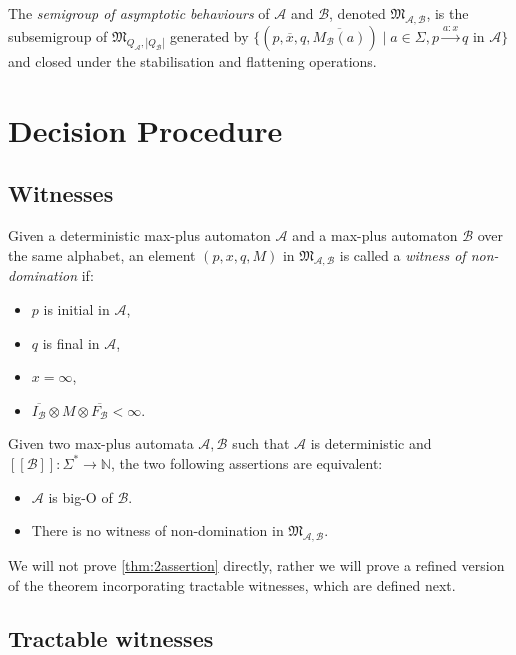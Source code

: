 \documentclass{lmcs}
\theoremstyle{remark}
\newcommand{\N}{\mathbb{N}}
\newcommand{\ideal}{\mathfrak{M}}
\newcommand{\autA}{\mathcal{A}}
\newcommand{\autB}{\mathcal{B}}
\newcommand{\brfunc}[1]{[\![#1]\!]}
\newcommand{\funcB}{\brfunc{\autB}}
\theoremstyle{remark}
\begin{document}
\begin{defi}\label{def:sgab}
The \emph{semigroup of asymptotic behaviours} of $\autA$ and $\autB$, denoted $\ideal_{\autA,\autB}$, is the subsemigroup of $\ideal_{Q_\autA,|Q_\autB|}$ generated by $\{(p,\overline{x},q,\overline{M_\autB(a)}) \mid a\in \Sigma, p\xrightarrow{a:x}q \text{ in } \autA\}$ and closed under the stabilisation and flattening operations.
\end{defi}


\section{Decision Procedure}
\label{sec:decision}

\subsection{Witnesses}

Given a deterministic max-plus automaton $\autA$ and a max-plus automaton $\autB$ over the same alphabet, an element $(p,x,q,M)$ in $\ideal_{\autA,\autB}$ is called a \emph{witness of non-domination} if:
\begin{itemize}
\item $p$ is initial in $\autA$,
\item $q$ is final in $\autA$,
\item $x = \infty$,
\item $\overline{I_\autB} \otimes M \otimes \overline{F_\autB} < \infty$.
\end{itemize}

\begin{thm}\label{thm:2assertion}
Given two max-plus automata $\autA,\autB$ such that $\autA$ is deterministic and $\funcB:\Sigma^* \to \N$, the two following assertions are equivalent:
\begin{itemize}
\item $\autA$ is big-O of $\autB$.
\item There is no witness of non-domination in $\ideal_{\autA,\autB}$.
\end{itemize}
\end{thm}
We will not prove \cref{thm:2assertion} directly, rather we will prove a refined version of the theorem incorporating tractable witnesses, which are defined next.

\subsection{Tractable witnesses}
\end{document}
